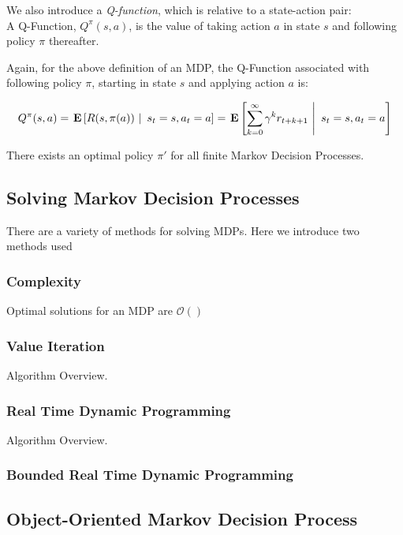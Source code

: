 \documentclass[11pt]{article}
\begin{document}
We also introduce a {\it Q-function}, which is relative to a state-action pair: \\

{ A \textup{Q-Function}, $Q^\pi(s,a)$, is the value of taking action $a$ in state $s$ and following policy $\pi$ thereafter}.

Again, for the above definition of an MDP, the Q-Function associated with following policy $\pi$, starting in state $s$ and applying action $a$ is:

\begin{equation}
Q^\pi(s,a) = \left.\E{R(s,\pi(a))\ \right|\ s_t = s, a_t = a} = \left.\E{\sum_{k=0}^\infty \gamma^k r_{t+k+1}\ \right|\ s_t = s, a_t = a}
\end{equation}

{\lemma There exists an optimal policy $\pi'$ for all finite Markov Decision Processes.}

\subsection{Solving Markov Decision Processes}

There are a variety of methods for solving MDPs. Here we introduce two methods used 

\subsubsection{Complexity}

{\theorem Optimal solutions for an MDP are $\mathcal{O}()$}

\subsubsection{Value Iteration}

Algorithm Overview.

\subsubsection{Real Time Dynamic Programming}

Algorithm Overview.

\subsubsection{Bounded Real Time Dynamic Programming}


\subsection{Object-Oriented Markov Decision Process}
\end{document}
